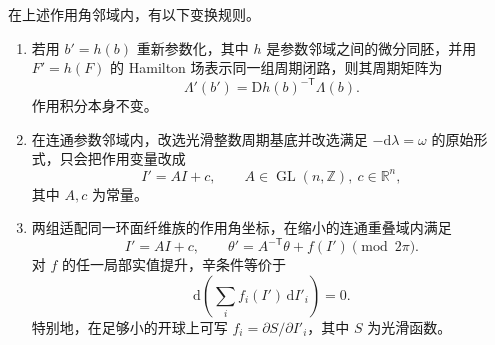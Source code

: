 \begin{proposition}\label{g4:prop:1102:action-angle-changes}
	在上述作用角邻域内，有以下变换规则。
	\begin{enumerate}
		\item 若用 \(b'=h(b)\) 重新参数化，其中 \(h\) 是参数邻域之间的微分同胚，并用 \(F'=h(F)\) 的 Hamilton 场表示同一组周期闭路，则其周期矩阵为
		\begin{equation}\label{g4:eq:1102:parameter-period-change}
			\Lambda'(b')=\mathrm{D}h(b)^{-\mathsf T}\Lambda(b).
		\end{equation}
		作用积分本身不变。
		\item 在连通参数邻域内，改选光滑整数周期基底并改选满足 \(-\mathrm{d}\lambda=\omega\) 的原始形式，只会把作用变量改成
		\begin{equation}\label{g4:eq:1102:integral-affine-change}
			I'=AI+c,\qquad A\in\operatorname{GL}(n,\mathbb Z),\
			c\in\mathbb R^n,
		\end{equation}
		其中 \(A,c\) 为常量。
		\item 两组适配同一环面纤维族的作用角坐标，在缩小的连通重叠域内满足
		\begin{equation}\label{g4:eq:1102:angle-change}
			I'=AI+c,\qquad
			\theta'=A^{-\mathsf T}\theta+f(I')\pmod{2\pi}.
		\end{equation}
		对 \(f\) 的任一局部实值提升，辛条件等价于
		\[
			\mathrm{d}\left(\sum_i f_i(I')\,\mathrm{d}I'_i\right)=0.
		\]
		特别地，在足够小的开球上可写 \(f_i=\partial S/\partial I'_i\)，其中 \(S\) 为光滑函数。
	\end{enumerate}
\end{proposition}
